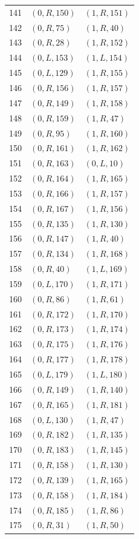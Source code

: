 \begin{longtable}{rll}
141 & $(0,R,150)$ & $(1,R,151)$ \\
142 & $(0,R,75)$ & $(1,R,40)$ \\
143 & $(0,R,28)$ & $(1,R,152)$ \\
144 & $(0,L,153)$ & $(1,L,154)$ \\
145 & $(0,L,129)$ & $(1,R,155)$ \\
146 & $(0,R,156)$ & $(1,R,157)$ \\
147 & $(0,R,149)$ & $(1,R,158)$ \\
148 & $(0,R,159)$ & $(1,R,47)$ \\
149 & $(0,R,95)$ & $(1,R,160)$ \\
150 & $(0,R,161)$ & $(1,R,162)$ \\
151 & $(0,R,163)$ & $(0,L,10)$ \\
152 & $(0,R,164)$ & $(1,R,165)$ \\
153 & $(0,R,166)$ & $(1,R,157)$ \\
154 & $(0,R,167)$ & $(1,R,156)$ \\
155 & $(0,R,135)$ & $(1,R,130)$ \\
156 & $(0,R,147)$ & $(1,R,40)$ \\
157 & $(0,R,134)$ & $(1,R,168)$ \\
158 & $(0,R,40)$ & $(1,L,169)$ \\
159 & $(0,L,170)$ & $(1,R,171)$ \\
160 & $(0,R,86)$ & $(1,R,61)$ \\
161 & $(0,R,172)$ & $(1,R,170)$ \\
162 & $(0,R,173)$ & $(1,R,174)$ \\
163 & $(0,R,175)$ & $(1,R,176)$ \\
164 & $(0,R,177)$ & $(1,R,178)$ \\
165 & $(0,L,179)$ & $(1,L,180)$ \\
166 & $(0,R,149)$ & $(1,R,140)$ \\
167 & $(0,R,165)$ & $(1,R,181)$ \\
168 & $(0,L,130)$ & $(1,R,47)$ \\
169 & $(0,R,182)$ & $(1,R,135)$ \\
170 & $(0,R,183)$ & $(1,R,145)$ \\
171 & $(0,R,158)$ & $(1,R,130)$ \\
172 & $(0,R,139)$ & $(1,R,165)$ \\
173 & $(0,R,158)$ & $(1,R,184)$ \\
174 & $(0,R,185)$ & $(1,R,86)$ \\
175 & $(0,R,31)$ & $(1,R,50)$ \\

\end{longtable}
